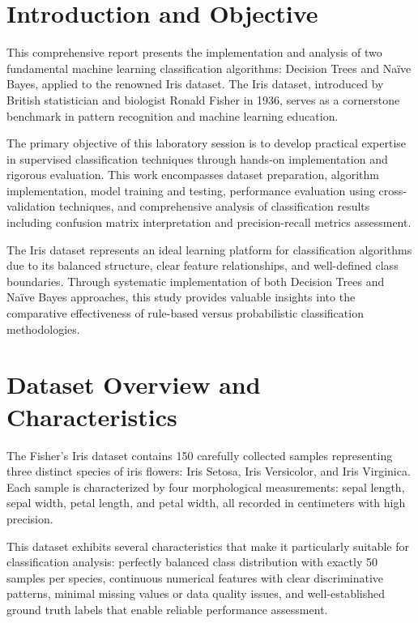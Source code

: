 \documentclass[12pt,a4paper]{article}
\begin{document}
\newpage
\thispagestyle{fancy}
\tableofcontents
\newpage

\section{Introduction and Objective}

This comprehensive report presents the implementation and analysis of two fundamental machine learning classification algorithms: Decision Trees and Na\"{i}ve Bayes, applied to the renowned Iris dataset. The Iris dataset, introduced by British statistician and biologist Ronald Fisher in 1936, serves as a cornerstone benchmark in pattern recognition and machine learning education.

The primary objective of this laboratory session is to develop practical expertise in supervised classification techniques through hands-on implementation and rigorous evaluation. This work encompasses dataset preparation, algorithm implementation, model training and testing, performance evaluation using cross-validation techniques, and comprehensive analysis of classification results including confusion matrix interpretation and precision-recall metrics assessment.

The Iris dataset represents an ideal learning platform for classification algorithms due to its balanced structure, clear feature relationships, and well-defined class boundaries. Through systematic implementation of both Decision Trees and Na\"{i}ve Bayes approaches, this study provides valuable insights into the comparative effectiveness of rule-based versus probabilistic classification methodologies.

\section{Dataset Overview and Characteristics}

The Fisher's Iris dataset contains 150 carefully collected samples representing three distinct species of iris flowers: Iris Setosa, Iris Versicolor, and Iris Virginica. Each sample is characterized by four morphological measurements: sepal length, sepal width, petal length, and petal width, all recorded in centimeters with high precision.

This dataset exhibits several characteristics that make it particularly suitable for classification analysis: perfectly balanced class distribution with exactly 50 samples per species, continuous numerical features with clear discriminative patterns, minimal missing values or data quality issues, and well-established ground truth labels that enable reliable performance assessment.
\end{document}
